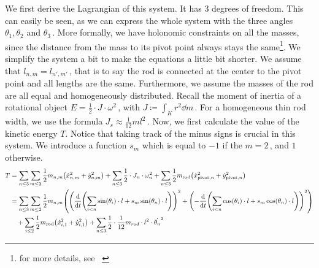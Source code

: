 \documentclass[11pt,a4paper, oneside,titlepage]{report}
\newcommand{\br}[1]{\mathopen{} \left( #1 \right)}
\newcommand{\kin}[2]{\frac{1}{2} m_{#1,#2}}
\newcommand{\dert}{\frac{\dd}{\dd t}}
\begin{document}
We first derive the Lagrangian of this system. It has 3 degrees of freedom. This can easily be seen, as we can express the whole system with the three angles $\theta_1, \theta_2$ and $\theta_3\,$. More formally, we have holonomic constraints on all the masses, since the distance from the mass to its pivot point always stays the same\footnote{for more details, see ~\cite{skript}}. We simplify the system a bit to make the equations a little bit shorter. We assume that $l_{n,m} = l_{n',m'}\,$, that is to say the rod is connected at the center to the pivot point and all lengths are the same. Furthermore, we assume the masses of the rod are all equal and homogeneously distributed. Recall the moment of inertia of a rotational object $E = \frac{1}{2} \cdot  J \cdot \omega^2\,$, with $J \coloneqq \int_K r^2\dd m \,$. For a homogeneous thin rod width, we use the formula $J_s \approx \frac{1}{12}ml^2\,$. Now, we first calculate the value of the kinetic energy $T$. Notice that taking track of the minus signs is crucial in this system. We introduce a function $s_{m}$ which is equal to $-1$ if the $m=2\,$, and $1$ otherwise.
\begin{align*}
T &= \sum_{n\leq 3}\sum_{m\leq 2} \kin{n}{m} \br{\dot{x}_{n,m}^2 + \dot{y}_{n,m}^2} + \sum_{n \leq 3} \frac{1}{2} \cdot  J_n \cdot \omega_n^2 + \sum_{n \leq 3} \frac{1}{2} m_{\textup{rod}} \br{\dot{x}_{{\textup{pivot}}, n}^2 + \dot{y}_{{\textup{pivot}}, n}^2}\\
&= \sum_{n\leq 3}\sum_{m\leq 2}\kin{n}{m} \br{\br{\dert\br{ \sum_{i < n} \sin \br{\theta_i} \cdot l + s_m \sin\br{\theta_n} \cdot l}}^2 + \br{- \dert \br{ \sum_{i < n}\cos \br{\theta_i} \cdot l+s_m \cos\br{\theta_n} \cdot l}}^2} \\
&{} \quad + \sum_{i\leq 2}\frac{1}{2} m_{\textup{rod}} \br{\dot{x}_{i,1}^2 + \dot{y}_{i,1}^2} +\sum_{n \leq 3}\frac{1}{2} \cdot  \frac{1}{12} m_{rod} \cdot l^2 \cdot \dot{\theta_n}^2
\end{align*}
\end{document}
